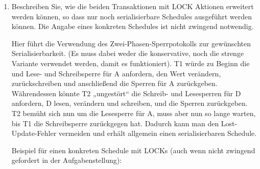 \documentclass{bschlangaul-aufgabe}
\begin{document}
\begin{enumerate}

\item Beschreiben Sie, wie die beiden Transaktionen mit LOCK Aktionen
erweitert werden können, so dass nur noch serialisierbare Schedules
ausgeführt werden können. Die Angabe eines konkreten Schedules ist nicht
zwingend notwendig.

\begin{liAntwort}
Hier führt die Verwendung des Zwei-Phasen-Sperrpotokolls zur gewünschten
Serialisierbarkeit. (Es muss dabei weder die konservative, noch die
strenge Variante verwendet werden, damit es funktioniert). T1 würde zu
Beginn die und Lese- und Schreibsperre für A anfordern, den Wert
verändern, zurückschreiben und anschließend die Sperren für A
zurückgeben. Währendessen könnte T2 „ungestört“ die Schreib- und
Lesesperren für D anfordern, D lesen, verändern und schreiben, und die
Sperren zurückgeben. T2 bemüht sich nun um die Lesesperre für A, muss
aber nun so lange warten, bis T1 die Schreibsperre zurückgegen hat.
Dadurch kann man den Lost-Update-Fehler vermeiden und erhält allgemein
einen serialisierbaren Schedule.

Beispiel für einen konkreten Schedule mit LOCKs (auch wenn nicht
zwingend gefordert in der Aufgabenstellung):


\end{liAntwort}
\end{enumerate}
\end{document}
